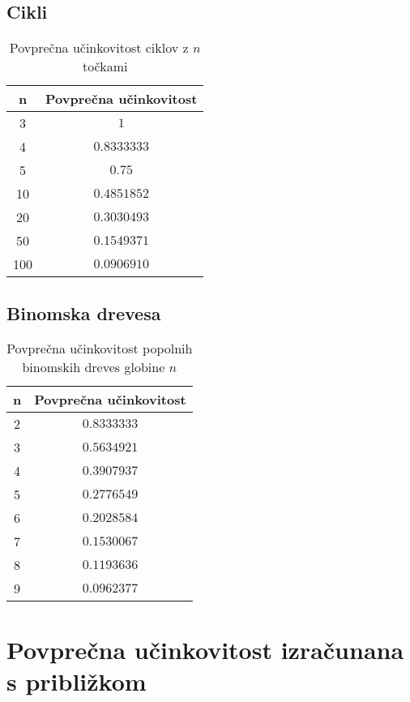 \documentclass[a4paper, 16pt]{article}
\begin{document}
    \subsection{Cikli}
    \begin{table}[!h]
        \begin{tabular}{c|c}
            n & Povprečna učinkovitost \\ \hline
            3   & $1$ \\
            4   & $0.8333333$ \\
            5   & $0.75$ \\
            10  & $0.4851852$ \\
            20  & $0.3030493$ \\
            50  & $0.1549371$ \\
            100 & $0.0906910$ \\

        \end{tabular}
        \caption{Povprečna učinkovitost ciklov z $n$ točkami}
        \label{table: 4}
    \end{table}

    \subsection{Binomska drevesa}
    \begin{table}[!h]
        \begin{tabular}{c|c}
            n & Povprečna učinkovitost \\ \hline
            2  & $0.8333333$ \\
            3  & $0.5634921$ \\
            4  & $0.3907937$ \\
            5  & $0.2776549$ \\
            6  & $0.2028584$ \\
            7  & $0.1530067$ \\
            8  & $0.1193636$ \\
            9  & $0.0962377$ 

        \end{tabular}
        \caption{Povprečna učinkovitost popolnih binomskih dreves globine $n$}
        \label{table: 5}
    \end{table}

\section{Povprečna učinkovitost izračunana s približkom}
\end{document}
